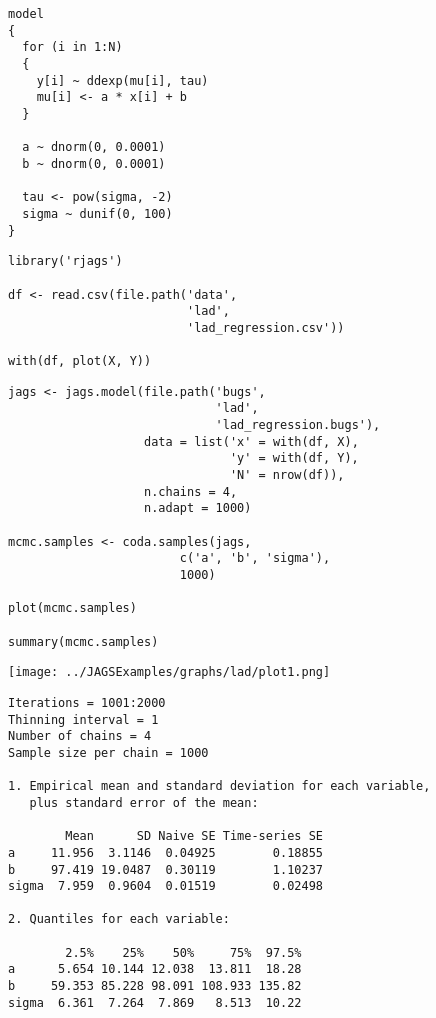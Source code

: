 \documentclass{beamer}
\begin{document}
\begin{frame}[fragile]
  \begin{verbatim}
model
{
  for (i in 1:N)
  {
    y[i] ~ ddexp(mu[i], tau)
    mu[i] <- a * x[i] + b
  }
  
  a ~ dnorm(0, 0.0001)
  b ~ dnorm(0, 0.0001)
  
  tau <- pow(sigma, -2)
  sigma ~ dunif(0, 100)
}

  \end{verbatim}
\end{frame}

\begin{frame}[fragile]
  \begin{verbatim}
library('rjags')

df <- read.csv(file.path('data',
                         'lad',
                         'lad_regression.csv'))

with(df, plot(X, Y))
  \end{verbatim}
\end{frame}

\begin{frame}[fragile]
  \begin{verbatim}
jags <- jags.model(file.path('bugs',
                             'lad',
                             'lad_regression.bugs'),
                   data = list('x' = with(df, X),
                               'y' = with(df, Y),
                               'N' = nrow(df)),
                   n.chains = 4,
                   n.adapt = 1000)
 
mcmc.samples <- coda.samples(jags,
                        c('a', 'b', 'sigma'),
                        1000)

plot(mcmc.samples)

summary(mcmc.samples)
  \end{verbatim}
\end{frame}

\begin{frame}[fragile]
  \begin{center}
    \texttt{[image: ../JAGSExamples/graphs/lad/plot1.png]}
  \end{center}
\end{frame}

\begin{frame}[fragile]
  \begin{verbatim}
Iterations = 1001:2000
Thinning interval = 1 
Number of chains = 4 
Sample size per chain = 1000 

1. Empirical mean and standard deviation for each variable,
   plus standard error of the mean:

        Mean      SD Naive SE Time-series SE
a     11.956  3.1146  0.04925        0.18855
b     97.419 19.0487  0.30119        1.10237
sigma  7.959  0.9604  0.01519        0.02498

2. Quantiles for each variable:

        2.5%    25%    50%     75%  97.5%
a      5.654 10.144 12.038  13.811  18.28
b     59.353 85.228 98.091 108.933 135.82
sigma  6.361  7.264  7.869   8.513  10.22
  \end{verbatim}
\end{frame}
\end{document}
